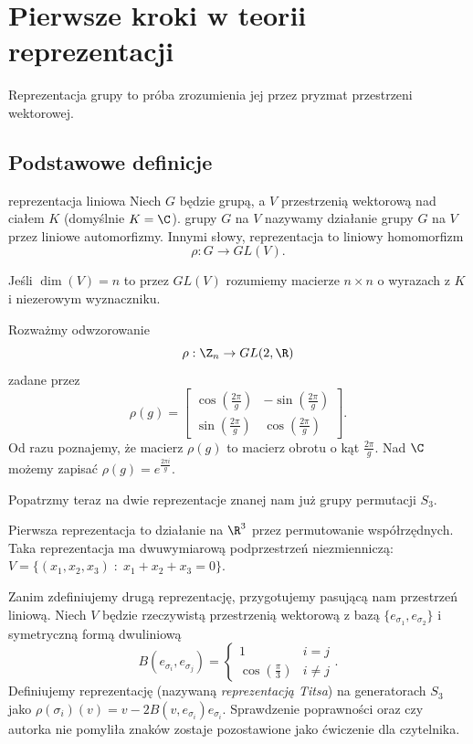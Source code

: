 \chapter{Pierwsze kroki w teorii reprezentacji}


Reprezentacja grupy to próba zrozumienia jej przez pryzmat przestrzeni wektorowej.

\section{Podstawowe definicje}

\begin{definition}{reprezentacja liniowa}{}
  Niech $G$ będzie grupą, a $V$ przestrzenią wektorową nad ciałem $K$ (domyślnie $K=\C$).  grupy $G$ na $V$ nazywamy działanie grupy $G$ na $V$ przez liniowe automorfizmy. Innymi słowy, reprezentacja to liniowy homomorfizm
  $$\rho:G\to GL(V).$$
\end{definition}

Jeśli $\dim(V)=n$ to przez $GL(V)$ rozumiemy macierze $n\times n$ o wyrazach z $K$ i niezerowym wyznaczniku.

\begin{example}[m]
  \item Rozważmy odwzorowanie 
    $$\rho: \Z_n\to GL(2, \R)$$
    zadane przez 
    $$\rho(g)=\begin{bmatrix}\cos(\frac{2\pi}{g})&-\sin(\frac{2\pi}{g})\\ \sin(\frac{2\pi}{g})&\cos(\frac{2\pi}{g})\end{bmatrix}.$$
    Od razu poznajemy, że macierz $\rho(g)$ to macierz obrotu o kąt $\frac{2\pi}{g}$. Nad $\C$ możemy zapisać $\rho(g)=e^{\frac{2\pi i}{g}}$.
  \item Popatrzmy teraz na dwie reprezentacje znanej nam już grupy permutacji $S_3$. 

    Pierwsza reprezentacja to działanie na $\R^3$ przez permutowanie współrzędnych. Taka reprezentacja ma dwuwymiarową podprzestrzeń niezmienniczą: $V=\{(x_1,x_2, x_3)\;:\;x_1+x_2+x_3=0\}$.

    Zanim zdefiniujemy drugą reprezentację, przygotujemy pasującą nam przestrzeń liniową. Niech $V$ będzie rzeczywistą przestrzenią wektorową z bazą $\{e_{\sigma_1}, e_{\sigma_2}\}$ i symetryczną formą dwuliniową
    $$B(e_{\sigma_i}, e_{\sigma_j})=\begin{cases}1 & i=j\\\cos(\frac{\pi}3)&i\neq j\end{cases}.$$
    Definiujemy reprezentację (nazywaną \emph{reprezentacją Titsa}) na generatorach $S_3$ jako $\rho(\sigma_i)(v)=v-2B(v, e_{\sigma_i})e_{\sigma_i}$. Sprawdzenie poprawności oraz czy autorka nie pomyliła znaków zostaje pozostawione jako ćwiczenie dla czytelnika.
\end{example}

